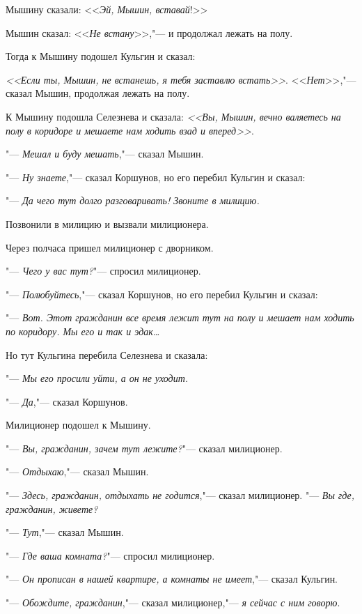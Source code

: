 Мышину сказали: <<\textit{Эй, Мышин, вставай}!>>

Мышин сказал: <<\textit{Не встану}>>,"--- и продолжал лежать на полу.

Тогда к Мышину подошел Кульгин и сказал:

\textit{<<Если ты, Мышин, не встанешь, я тебя заставлю встать>>}.
<<\textit{Нет}>>,"--- сказал Мышин, продолжая лежать на полу.

К Мышину подошла Селезнева и сказала:
\textit{<<Вы, Мышин, вечно валяетесь на полу в коридоре и мешаете нам ходить взад и вперед>>}.

"--- \textit{Мешал и буду мешать},"--- сказал Мышин.

"--- \textit{Ну знаете},"--- сказал Коршунов, но его перебил Кульгин и сказал:

"--- \textit{Да чего тут долго разговаривать! Звоните в милицию.}

Позвонили в милицию и вызвали милиционера.

Через полчаса пришел милиционер с дворником.

"--- \textit{Чего у вас тут?}"--- спросил милиционер.

"--- \textit{Полюбуйтесь},"--- сказал Коршунов, но его перебил Кульгин и сказал:

"--- \textit{Вот. Этот гражданин все время лежит тут на полу и мешает нам ходить по коридору. Мы его и так и эдак\dots}

Но тут Кульгина перебила Селезнева и сказала:

"--- \textit{Мы его просили уйти, а он не уходит.}

"--- \textit{Да},"--- сказал Коршунов.

Милиционер подошел к Мышину.

"--- \textit{Вы, гражданин, зачем тут лежите?}"--- сказал милиционер.

"--- \textit{Отдыхаю},"--- сказал Мышин.

"--- \textit{Здесь, гражданин, отдыхать не годится},"--- сказал милиционер. "--- \textit{Вы где, гражданин, живете?}

"--- \textit{Тут},"--- сказал Мышин.

"--- \textit{Где ваша комната?}"--- спросил милиционер.

"--- \textit{Он прописан в нашей квартире, а комнаты не имеет},"--- сказал Кульгин.

"--- \textit{Обождите, гражданин},"--- сказал милиционер,"--- \textit{я сейчас с ним говорю}.

